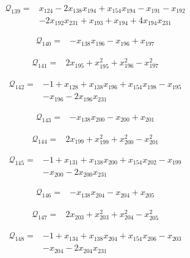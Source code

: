 \begin{align*}
\mathcal{Q}_{139}={}&x_{124}-2x_{138}x_{194}+x_{154}x_{194}-x_{191}-x_{192}\\
&-2x_{192}x_{231}+x_{193}+x_{194}+4x_{194}x_{231}
\end{align*}

\begin{align*}
\mathcal{Q}_{140}={}&-x_{138}x_{196}-x_{196}+x_{197}
\end{align*}

\begin{align*}
\mathcal{Q}_{141}={}&2x_{195}+x_{195}^{2}+x_{196}^{2}-x_{197}^{2}
\end{align*}

\begin{align*}
\mathcal{Q}_{142}={}&-1+x_{128}+x_{138}x_{196}+x_{154}x_{198}-x_{195}\\
&-x_{196}-2x_{196}x_{231}
\end{align*}

\begin{align*}
\mathcal{Q}_{143}={}&-x_{138}x_{200}-x_{200}+x_{201}
\end{align*}

\begin{align*}
\mathcal{Q}_{144}={}&2x_{199}+x_{199}^{2}+x_{200}^{2}-x_{201}^{2}
\end{align*}

\begin{align*}
\mathcal{Q}_{145}={}&-1+x_{131}+x_{138}x_{200}+x_{154}x_{202}-x_{199}\\
&-x_{200}-2x_{200}x_{231}
\end{align*}

\begin{align*}
\mathcal{Q}_{146}={}&-x_{138}x_{204}-x_{204}+x_{205}
\end{align*}

\begin{align*}
\mathcal{Q}_{147}={}&2x_{203}+x_{203}^{2}+x_{204}^{2}-x_{205}^{2}
\end{align*}

\begin{align*}
\mathcal{Q}_{148}={}&-1+x_{134}+x_{138}x_{204}+x_{154}x_{206}-x_{203}\\
&-x_{204}-2x_{204}x_{231}
\end{align*}

